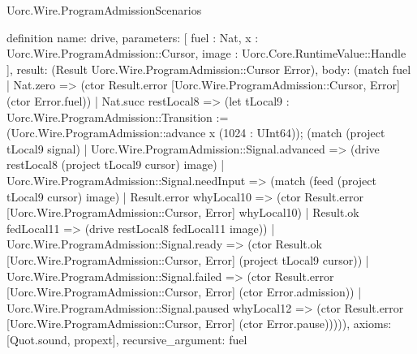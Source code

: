 \begin{lexlean}{Uorc.Wire.ProgramAdmissionScenarios}
\begin{semanticmodule}
definition{
  name: drive,
  parameters: [
    fuel : Nat,
    x : Uorc.Wire.ProgramAdmission::Cursor,
    image : Uorc.Core.RuntimeValue::Handle
  ],
  result: (Result Uorc.Wire.ProgramAdmission::Cursor Error),
  body: (match fuel
    | Nat.zero => (ctor Result.error [Uorc.Wire.ProgramAdmission::Cursor, Error] (ctor Error.fuel))
    | Nat.succ restLocal8 => (let tLocal9 : Uorc.Wire.ProgramAdmission::Transition := (Uorc.Wire.ProgramAdmission::advance x (1024 : UInt64)); (match (project tLocal9 signal)
      | Uorc.Wire.ProgramAdmission::Signal.advanced => (drive restLocal8 (project tLocal9 cursor) image)
      | Uorc.Wire.ProgramAdmission::Signal.needInput => (match (feed (project tLocal9 cursor) image)
        | Result.error whyLocal10 => (ctor Result.error [Uorc.Wire.ProgramAdmission::Cursor, Error] whyLocal10)
        | Result.ok fedLocal11 => (drive restLocal8 fedLocal11 image))
      | Uorc.Wire.ProgramAdmission::Signal.ready => (ctor Result.ok [Uorc.Wire.ProgramAdmission::Cursor, Error] (project tLocal9 cursor))
      | Uorc.Wire.ProgramAdmission::Signal.failed => (ctor Result.error [Uorc.Wire.ProgramAdmission::Cursor, Error] (ctor Error.admission))
      | Uorc.Wire.ProgramAdmission::Signal.paused whyLocal12 => (ctor Result.error [Uorc.Wire.ProgramAdmission::Cursor, Error] (ctor Error.pause))))),
  axioms: [Quot.sound, propext],
  recursive_argument: fuel
}


\end{semanticmodule}
\end{lexlean}
